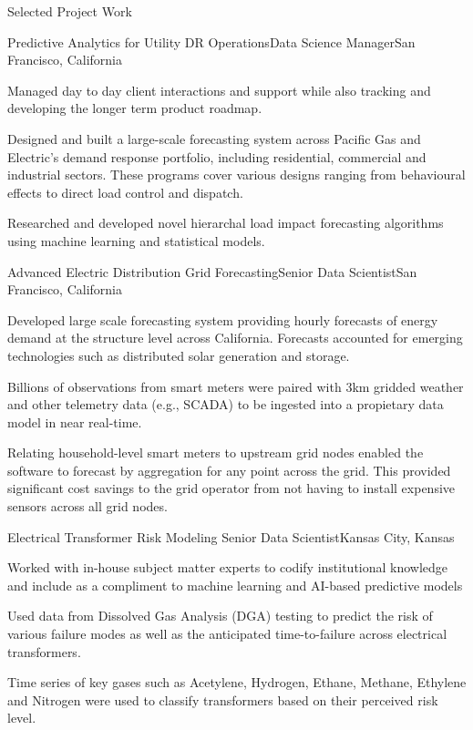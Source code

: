 \documentclass{resume} %
\begin{document}
\begin{rSection}{Selected Project Work}

\begin{rSubsection}{Predictive Analytics for Utility DR Operations}{}{Data Science Manager}{San Francisco, California}
\item[] Managed day to day client interactions and support while also tracking and developing the longer term product roadmap.
\item[] Designed and built a large-scale forecasting system across Pacific Gas and Electric's demand response portfolio, including residential, commercial and industrial sectors. These programs cover various designs ranging from behavioural effects to direct load control and dispatch.
\item[] Researched and developed novel hierarchal load impact forecasting algorithms using machine learning and statistical models.
\end{rSubsection}

\begin{rSubsection}{Advanced Electric Distribution Grid Forecasting}{}{Senior Data Scientist}{San Francisco, California}
\item[] Developed large scale forecasting system providing hourly forecasts of energy demand at the structure level across California. Forecasts accounted for emerging technologies such as distributed solar generation and storage.
\item[] Billions of observations from smart meters were paired with 3km gridded weather and other telemetry data (e.g., SCADA) to be ingested into a propietary data model in near real-time.
\item[] Relating household-level smart meters to upstream grid nodes enabled the software to forecast by aggregation for any point across the grid. This provided significant cost savings to the grid operator from not having to install expensive sensors across all grid nodes.
\end{rSubsection}

\begin{rSubsection}{Electrical Transformer Risk Modeling }{}{Senior Data Scientist}{Kansas City, Kansas}
\item[] Worked with in-house subject matter experts to codify institutional knowledge and include as a compliment to machine learning and AI-based predictive models
\item[] Used data from Dissolved Gas Analysis (DGA) testing  to predict the risk of various failure modes as well as the anticipated time-to-failure across electrical transformers.
\item[] Time series of key gases such as Acetylene, Hydrogen, Ethane, Methane, Ethylene and Nitrogen were used to classify transformers based on their perceived risk level.
\end{rSubsection}


\end{rSection}
\end{document}
